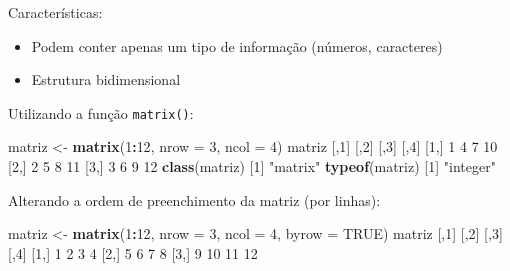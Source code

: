 \documentclass[10pt,a4paper]{book}
\newenvironment{Shaded}{\begin{snugshade}}{\end{snugshade}}
\newcommand{\KeywordTok}[1]{\textcolor[rgb]{0.13,0.29,0.53}{\textbf{#1}}}
\newcommand{\DataTypeTok}[1]{\textcolor[rgb]{0.13,0.29,0.53}{#1}}
\newcommand{\DecValTok}[1]{\textcolor[rgb]{0.00,0.00,0.81}{#1}}
\newcommand{\StringTok}[1]{\textcolor[rgb]{0.31,0.60,0.02}{#1}}
\newcommand{\OtherTok}[1]{\textcolor[rgb]{0.56,0.35,0.01}{#1}}
\newcommand{\OperatorTok}[1]{\textcolor[rgb]{0.81,0.36,0.00}{\textbf{#1}}}
\newcommand{\NormalTok}[1]{#1}
\providecommand{\tightlist}{%
  \setlength{\itemsep}{0pt}\setlength{\parskip}{0pt}}
\begin{document}
Características:

\begin{itemize}
\tightlist
\item
  Podem conter apenas um tipo de informação (números, caracteres)
\item
  Estrutura bidimensional
\end{itemize}

Utilizando a função \texttt{matrix()}:

\begin{Shaded}
\begin{Highlighting}[]
\NormalTok{matriz <-}\StringTok{ }\KeywordTok{matrix}\NormalTok{(}\DecValTok{1}\OperatorTok{:}\DecValTok{12}\NormalTok{, }\DataTypeTok{nrow =} \DecValTok{3}\NormalTok{, }\DataTypeTok{ncol =} \DecValTok{4}\NormalTok{)}
\NormalTok{matriz}
\NormalTok{     [,}\DecValTok{1}\NormalTok{] [,}\DecValTok{2}\NormalTok{] [,}\DecValTok{3}\NormalTok{] [,}\DecValTok{4}\NormalTok{]}
\NormalTok{[}\DecValTok{1}\NormalTok{,]    }\DecValTok{1}    \DecValTok{4}    \DecValTok{7}   \DecValTok{10}
\NormalTok{[}\DecValTok{2}\NormalTok{,]    }\DecValTok{2}    \DecValTok{5}    \DecValTok{8}   \DecValTok{11}
\NormalTok{[}\DecValTok{3}\NormalTok{,]    }\DecValTok{3}    \DecValTok{6}    \DecValTok{9}   \DecValTok{12}
\KeywordTok{class}\NormalTok{(matriz)}
\NormalTok{[}\DecValTok{1}\NormalTok{] }\StringTok{"matrix"}
\KeywordTok{typeof}\NormalTok{(matriz)}
\NormalTok{[}\DecValTok{1}\NormalTok{] }\StringTok{"integer"}
\end{Highlighting}
\end{Shaded}

Alterando a ordem de preenchimento da matriz (por linhas):

\begin{Shaded}
\begin{Highlighting}[]
\NormalTok{matriz <-}\StringTok{ }\KeywordTok{matrix}\NormalTok{(}\DecValTok{1}\OperatorTok{:}\DecValTok{12}\NormalTok{, }\DataTypeTok{nrow =} \DecValTok{3}\NormalTok{, }\DataTypeTok{ncol =} \DecValTok{4}\NormalTok{, }\DataTypeTok{byrow =} \OtherTok{TRUE}\NormalTok{)}
\NormalTok{matriz}
\NormalTok{     [,}\DecValTok{1}\NormalTok{] [,}\DecValTok{2}\NormalTok{] [,}\DecValTok{3}\NormalTok{] [,}\DecValTok{4}\NormalTok{]}
\NormalTok{[}\DecValTok{1}\NormalTok{,]    }\DecValTok{1}    \DecValTok{2}    \DecValTok{3}    \DecValTok{4}
\NormalTok{[}\DecValTok{2}\NormalTok{,]    }\DecValTok{5}    \DecValTok{6}    \DecValTok{7}    \DecValTok{8}
\NormalTok{[}\DecValTok{3}\NormalTok{,]    }\DecValTok{9}   \DecValTok{10}   \DecValTok{11}   \DecValTok{12}
\end{Highlighting}
\end{Shaded}
\end{document}
